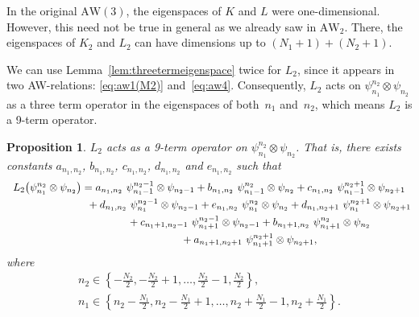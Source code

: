 \documentclass[pdftex]{sigma}
\numberwithin{equation}{section}
\newtheorem{Proposition}[Theorem]{Proposition}
 { \theoremstyle{definition}
\newtheorem{Definition}[Theorem]{Definition}
\newtheorem{Note}[Theorem]{Note}
\newtheorem{Example}[Theorem]{Example}
\newtheorem{Remark}[Theorem]{Remark} }
\newcommand{\aw}{\mathrm{AW}\!\left(3\right)}
\newcommand{\AW}[1]{\mathrm{AW}_{#1}}
\begin{document}
\begin{Remark}
	In the original $\aw$, the eigenspaces of $K$ and $L$ were one-dimensional. However, this need not be true in general as we already saw in $\AW{2}$. There, the eigenspaces of $K_2$ and $L_2$ can have dimensions up to $(N_1+1)+(N_2+1)$.
\end{Remark}
We can use Lemma~\ref{lem:threetermeigenspace} twice for $L_2$, since it appears in two AW-relations: \eqref{eq:aw1(M2)} and~\eqref{eq:aw4}. Consequently, $L_2$ acts on $\psi_{n_1}^{n_2}\otimes \psi_{n_2}$ as a three term operator in the eigenspaces of both~$n_1$ and~$n_2$, which means $L_2$ is a 9-term operator.
\begin{Proposition}
	$L_2$ acts as a 9-term operator on $\psi_{n_1}^{n_2}\otimes \psi_{n_2}$. That is, there exists constants $a_{n_1,n_2}$, $b_{n_1,n_2}$, $c_{n_1,n_2}$, $d_{n_1,n_2}$ and $e_{n_1,n_2}$ such that
	\begin{gather}
L_2\big(\psi_{n_1}^{n_2}\otimes \psi_{n_2}\big) = a_{n_1,n_2}\ \psi_{n_1-1}^{n_2-1}\otimes \psi_{n_2-1}+b_{n_1,n_2}\ \psi_{n_1-1}^{n_2}\otimes \psi_{n_2}+c_{n_1,n_2}\ \psi_{n_1-1}^{n_2+1}\otimes \psi_{n_2+1}\nonumber\\
\hphantom{L_2\big(\psi_{n_1}^{n_2}\otimes \psi_{n_2}\big) =}{}
+ d_{n_1,n_2}\ \psi_{n_1}^{n_2-1}\otimes \psi_{n_2-1} + e_{n_1,n_2}\ \psi_{n_1}^{n_2}\otimes \psi_{n_2}+d_{n_1,n_2+1}\ \psi_{n_1}^{n_2+1}\otimes \psi_{n_2+1}\nonumber\\
\hphantom{L_2\big(\psi_{n_1}^{n_2}\otimes \psi_{n_2}\big) =}{}
+ c_{n_1+1,n_2-1}\ \psi_{n_1+1}^{n_2-1}\otimes \psi_{n_2-1}+b_{n_1+1,n_2}\ \psi_{n_1+1}^{n_2}\otimes \psi_{n_2}\nonumber\\
\hphantom{L_2\big(\psi_{n_1}^{n_2}\otimes \psi_{n_2}\big) =}{}
+ a_{n_1+1,n_2+1}\ \psi_{n_1+1}^{n_2+1}\otimes \psi_{n_2+1}, \label{eq:9terms}
	\end{gather}
	where
	\begin{gather}
n_2\in\left\{-\frac{N_2}{2},-\frac{N_2}{2}+1,\dots,\frac{N_2}{2}-1,\frac{N_2}{2}\right\},\nonumber\\
n_1\in\left\{n_2-\frac{N_1}{2},n_2-\frac{N_1}{2}+1,\dots,n_2+\frac{N_1}{2}-1,n_2+\frac{N_1}{2}\right\}.\label{eq:n1n2waarvandaan}
	\end{gather}
\end{Proposition}
\end{document}
